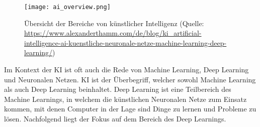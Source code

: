 \begin{figure}[h]
	\centering
	\texttt{[image: ai\_overview.png]}
	\caption{Übersicht der Bereiche von künstlicher Intelligenz (Quelle: \url{https://www.alexanderthamm.com/de/blog/ki_artificial-intelligence-ai-kuenstliche-neuronale-netze-machine-learning-deep-learning/})}
\end{figure}

Im Kontext der \ac{KI} ist oft auch die Rede von Machine Learning, Deep Learning und Neuronalen Netzen. \ac{KI} ist der Überbegriff, welcher sowohl Machine Learning als auch Deep Learning beinhaltet. Deep Learning ist eine Teilbereich des Machine Learnings, in welchem die künstlichen Neuronalen Netze zum Einsatz kommen, mit denen Computer in der Lage sind Dinge zu lernen und Probleme zu lösen. Nachfolgend liegt der Fokus auf dem Bereich des Deep Learnings.
